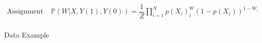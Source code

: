 \begin{align*}
    \text{Assignment Mechanism:}\,&\mathbb{P}(W|X,Y(1),Y(0))=\dfrac{1}{Z}\prod_{i=1}^N p(X_i)^W_i(1-p(X_i))^{1-W_i}\\
\end{align*}






    
    
    
    


    


    \begin{point}
        Data Example
    \end{point}
    
